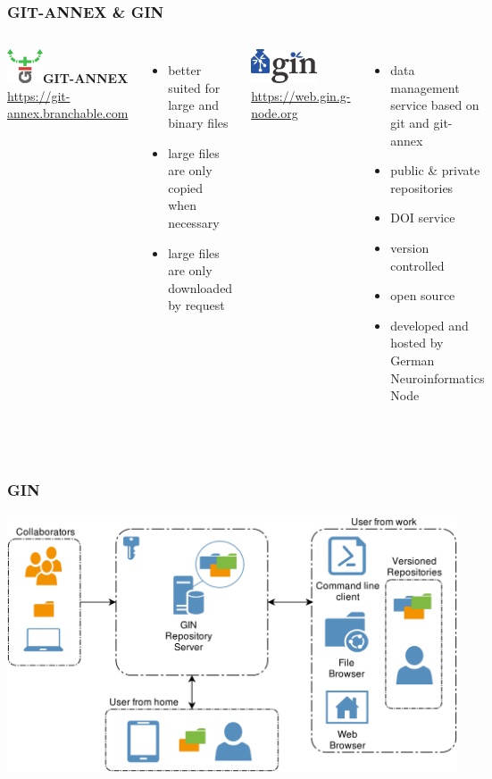 \documentclass[
t, %
10pt, %
aspectratio=1610, %
ngerman,
english,
]{beamer}
\begin{document}
\begin{frame}
    \frametitle{GIT-ANNEX \& GIN}
    \begin{columns}
	\includegraphics[height=1cm]{graphics/gitannex_logo}\textbf{GIT-ANNEX}\\
	\url{https://git-annex.branchable.com}\\
	\begin{itemize}
	    \item better suited for large and binary files
	    \item large files are only copied when necessary
	    \item large files are only downloaded by request
	\end{itemize}
	\includegraphics[height=1cm]{graphics/GinLogo}\\
	\url{https://web.gin.g-node.org}\\
	\begin{itemize}
	    \item data management service based on git and git-annex
	    \item public \& private repositories
	    \item DOI service
	    \item version controlled
	    \item open source
	    \item developed and hosted by German Neuroinformatics Node
	\end{itemize}
    \end{columns}\\
\end{frame}

\begin{frame}
    \frametitle{GIN}
    \centering
    \includegraphics[height=0.7\textheight]{graphics/image9539.png}\\
\end{frame}
\end{document}
